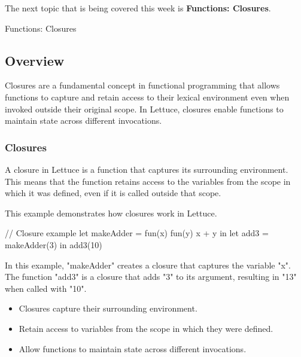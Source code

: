 The next topic that is being covered this week is \textbf{Functions: Closures}.

\begin{notes}{Functions: Closures}
    \subsection*{Overview}

    Closures are a fundamental concept in functional programming that allows functions to capture and retain access to their lexical environment even when invoked outside their original scope. In 
    Lettuce, closures enable functions to maintain state across different invocations.
    
    \subsubsection*{Closures}
    
    A closure in Lettuce is a function that captures its surrounding environment. This means that the function retains access to the variables from the scope in which it was defined, even if it is 
    called outside that scope.
    
    \begin{highlight}[Closures]
    
        This example demonstrates how closures work in Lettuce.
    
    \begin{code}[Lettuce]
    // Closure example
    let makeAdder = fun(x) {
        fun(y) { x + y }
    } in
    let add3 = makeAdder(3) in
    add3(10)
    \end{code}
    
        In this example, "makeAdder" creates a closure that captures the variable "x". The function "add3" is a closure that adds "3" to its argument, resulting in "13" when called with "10".
    
        \begin{itemize}
            \item Closures capture their surrounding environment.
            \item Retain access to variables from the scope in which they were defined.
            \item Allow functions to maintain state across different invocations.
        \end{itemize}
    
    \end{highlight}
    

\end{notes}
